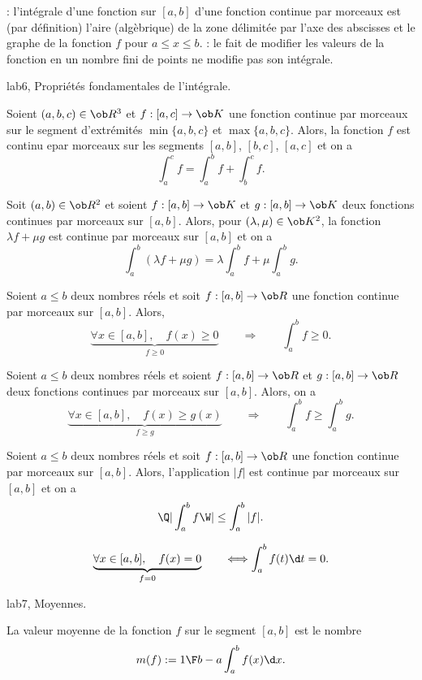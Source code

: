 \Remarque : l'int\'egrale d'une fonction sur $[a,b]$ d'une fonction continue par morceaux est (par d\'efinition) l'aire (alg\`ebrique) de la zone d\'elimit\'ee par l'axe des abscisses et le graphe de la fonction $f$ pour $a\le x\le b$. 
\bigskip
\Remarque  : le fait de modifier les valeurs de la fonction en un nombre fini de points ne modifie pas son int\'egrale. 
\bigskip

\Subsection lab6, Propri\'et\'es fondamentales de l'int\'egrale. 
\bigskip

\Propriete [Title=Relation de Chasles]
Soient $(a,b,c)\in\ob R^3$ et $f:[a,c]\to\ob K$ une fonction continue par morceaux sur le segment d'extr\'emit\'es $\min\{a,b,c\}$ et $\max\{a,b,c\}$. Alors, la fonction $f$ est continu epar morceaux sur les segments $[a,b]$, $[b,c]$, $[a,c]$ et on a 
$$
\int_a^cf=\int_a^bf+\int_b^cf. 
$$

\Propriete [Title=Lin\'earit\'e de l'int\'egrale]
Soit $(a,b)\in\ob R^2$ et soient $f:[a,b]\to\ob K$ et $g:[a,b]\to\ob K$ deux fonctions continues par morceaux sur $[a,b]$. Alors, pour $(\lambda,\mu)\in\ob K^2$, la fonction $\lambda f+\mu g$ est continue par morceaux sur $[a,b]$ et on a 
$$
\int_a^b(\lambda f+\mu g)=\lambda \int_a^bf+\mu \int_a^bg. 
$$

\Propriete [Title=positivit\'e de l'int\'egrale]
Soient $a\le b$ deux nombres r\'eels et soit $f:[a,b]\to\ob R$ une fonction continue par morceaux sur $[a,b]$. Alors, 
$$
\underbrace{
\forall x\in[a,b],\quad f(x)\ge0}_{f\ge0}\qquad\Longrightarrow\qquad \int_a^bf\ge0.
$$ 
\bigskip


\Propriete [Title=Croissance de l'int\'egrale]
Soient $a\le b$ deux nombres r\'eels et soient $f:[a,b]\to\ob R$ et $g:[a,b]\to\ob R$ deux fonctions continues par morceaux sur $[a,b]$. Alors, on a 
$$
\underbrace{
\forall x\in[a,b],\quad f(x)\ge g(x)}_{f\ge g}\qquad\Longrightarrow\qquad \int_a^bf\ge \int_a^bg.
$$ 

\Propriete [Title=module]
Soient $a\le b$ deux nombres r\'eels et soit $f:[a,b]\to\ob R$ une fonction 
continue par morceaux sur $[a,b]$. Alors, l'application $|f|$ est continue par morceaux sur $[a,b]$ et on a 
$$
\Q|\int_a^bf\W|\le \int_a^b|f|.
$$ 
\bigskip

$$
\underbrace{\forall x\in[a,b],\quad f(x)=0}_{f=0}\qquad\Longleftrightarrow \int_a^bf(t)\d t=0.
$$

\Subsection lab7, Moyennes. 
\bigskip

La valeur moyenne de la fonction $f$ sur le segment $[a,b]$ est le nombre
$$
m(f):={1\F b-a}\int_a^bf(x)\d x.
$$

